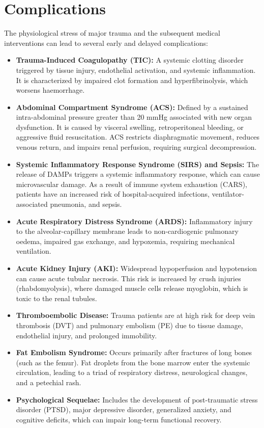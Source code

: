 \section*{Complications}
The physiological stress of major trauma and the subsequent medical interventions can lead to several early and delayed complications:
\begin{itemize}
    \item \textbf{Trauma-Induced Coagulopathy (TIC):} A systemic clotting disorder triggered by tissue injury, endothelial activation, and systemic inflammation. It is characterized by impaired clot formation and hyperfibrinolysis, which worsens haemorrhage.
    \item \textbf{Abdominal Compartment Syndrome (ACS):} Defined by a sustained intra-abdominal pressure greater than 20 mmHg associated with new organ dysfunction. It is caused by visceral swelling, retroperitoneal bleeding, or aggressive fluid resuscitation. ACS restricts diaphragmatic movement, reduces venous return, and impairs renal perfusion, requiring surgical decompression.
    \item \textbf{Systemic Inflammatory Response Syndrome (SIRS) and Sepsis:} The release of DAMPs triggers a systemic inflammatory response, which can cause microvascular damage. As a result of immune system exhaustion (CARS), patients have an increased risk of hospital-acquired infections, ventilator-associated pneumonia, and sepsis.
    \item \textbf{Acute Respiratory Distress Syndrome (ARDS):} Inflammatory injury to the alveolar-capillary membrane leads to non-cardiogenic pulmonary oedema, impaired gas exchange, and hypoxemia, requiring mechanical ventilation.
    \item \textbf{Acute Kidney Injury (AKI):} Widespread hypoperfusion and hypotension can cause acute tubular necrosis. This risk is increased by crush injuries (rhabdomyolysis), where damaged muscle cells release myoglobin, which is toxic to the renal tubules.
    \item \textbf{Thromboembolic Disease:} Trauma patients are at high risk for deep vein thrombosis (DVT) and pulmonary embolism (PE) due to tissue damage, endothelial injury, and prolonged immobility.
    \item \textbf{Fat Embolism Syndrome:} Occurs primarily after fractures of long bones (such as the femur). Fat droplets from the bone marrow enter the systemic circulation, leading to a triad of respiratory distress, neurological changes, and a petechial rash.
    \item \textbf{Psychological Sequelae:} Includes the development of post-traumatic stress disorder (PTSD), major depressive disorder, generalized anxiety, and cognitive deficits, which can impair long-term functional recovery.
\end{itemize}

